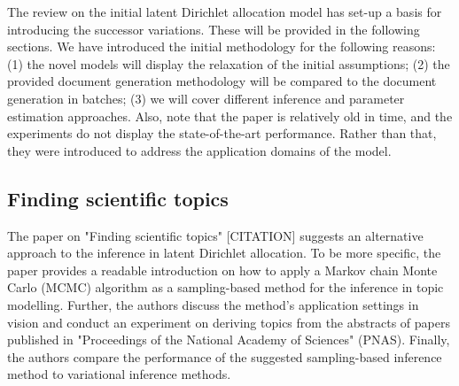 \documentclass{mprop}
\begin{document}
\par The review on the initial latent Dirichlet allocation model has set-up a basis for introducing the successor variations. These will be provided in the following sections. We have introduced the initial methodology for the following reasons: (1) the novel models will display the relaxation of the initial assumptions; (2) the provided document generation methodology will be compared to the document generation in batches; (3) we will cover different inference and parameter estimation approaches. Also, note that the paper is relatively old in time, and the experiments do not display the state-of-the-art performance. Rather than that, they were introduced to address the application domains of the model. 

\subsection{Finding scientific topics}

\par The paper on "Finding scientific topics" [CITATION] suggests an alternative approach to the inference in latent Dirichlet allocation. To be more specific, the paper provides a readable introduction on how to apply a Markov chain Monte Carlo (MCMC) algorithm as a sampling-based method for the inference in topic modelling. Further, the authors discuss the method's application settings in vision and conduct an experiment on deriving topics from the abstracts of papers published in "Proceedings of the National Academy of Sciences" (PNAS). Finally, the authors compare the performance of the suggested sampling-based inference method to variational inference methods. 
\end{document}
